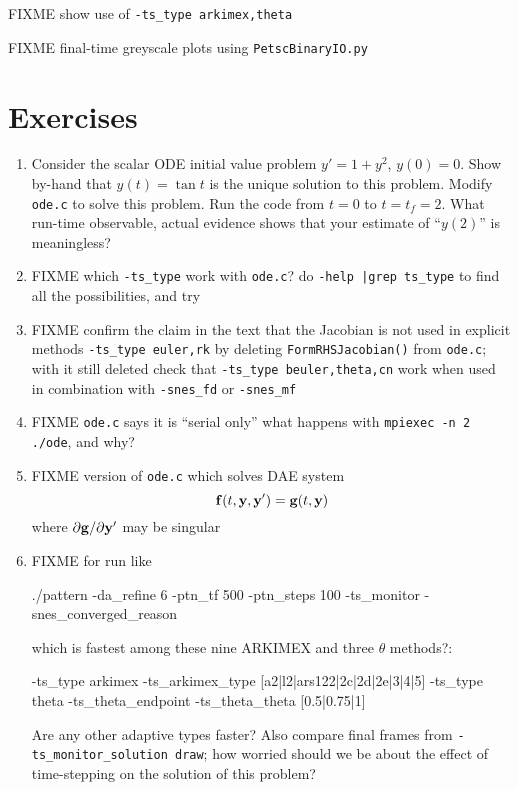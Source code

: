 
FIXME show use of \texttt{-ts\_type arkimex,theta}

FIXME final-time greyscale plots using \texttt{PetscBinaryIO.py}


\section{Exercises}

\renewcommand{\labelenumi}{\arabic{chapter}.\arabic{enumi}\quad}
\renewcommand{\labelenumii}{(\alph{enumii})}
\begin{enumerate}
\item \label{exer:ts:tan}  Consider the scalar ODE initial value problem $y'=1+y^2$, $y(0)=0$.  Show by-hand that $y(t)=\tan t$ is the unique solution to this problem.  Modify \texttt{ode.c} to solve this problem.  Run the code from $t=0$ to $t=t_f=2$.  What run-time observable, actual evidence shows that your estimate of ``$y(2)$'' is meaningless?
\item FIXME which \texttt{-ts\_type} work with \texttt{ode.c}?  do \texttt{-help |grep ts\_type} to find all the possibilities, and try 
\item FIXME confirm the claim in the text that the Jacobian is not used in explicit methods \texttt{-ts\_type euler,rk} by deleting \texttt{FormRHSJacobian()} from \texttt{ode.c}; with it still deleted check that \texttt{-ts\_type beuler,theta,cn} work when used in combination with \texttt{-snes\_fd} or \texttt{-snes\_mf}
\item FIXME \texttt{ode.c} says it is ``serial only''  what happens with \texttt{mpiexec -n 2 ./ode}, and why?
\item FIXME version of \texttt{ode.c} which solves DAE system
    $$\mathbf{f}(t,\mathbf{y},\mathbf{y}') = \mathbf{g}(t,\mathbf{y})$$
where $\partial \mathbf{g}/\partial \mathbf{y}'$ may be singular
\item FIXME for run like
\begin{cline}
./pattern -da_refine 6 -ptn_tf 500 -ptn_steps 100 -ts_monitor -snes_converged_reason
\end{cline}
which is fastest among these nine ARKIMEX and three $\theta$ methods?:
\begin{code}
-ts_type arkimex -ts_arkimex_type [a2|l2|ars122|2c|2d|2e|3|4|5]
-ts_type theta -ts_theta_endpoint -ts_theta_theta [0.5|0.75|1]
\end{code}
Are any other adaptive \pTS types faster?  Also compare final frames from \texttt{-ts\_monitor\_solution draw}; how worried should we be about the effect of time-stepping on the solution of this problem?
\end{enumerate}
